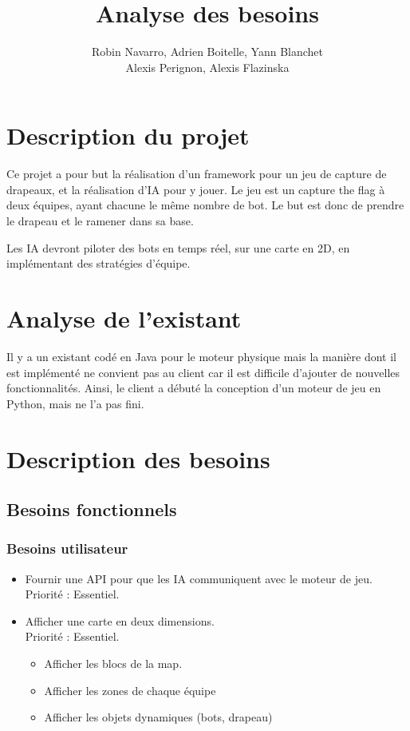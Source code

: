 \documentclass{article}
\title{Analyse des besoins}
\author{Robin Navarro, Adrien Boitelle, Yann Blanchet\\Alexis Perignon, Alexis Flazinska}
\begin{document}
\maketitle
\newpage
\tableofcontents
\newpage
\section{Description du projet}

Ce projet a pour but la réalisation d'un framework pour un jeu de capture de drapeaux, et la réalisation d'IA pour y jouer.
Le jeu est un capture the flag à deux équipes, ayant chacune le même nombre de bot. Le but est donc de prendre le drapeau et le ramener dans sa base.\newline

Les IA devront piloter des bots en temps réel, sur une carte en 2D, en implémentant des stratégies d'équipe.


\section{Analyse de l'existant}
    
Il y a un existant codé en Java pour le moteur physique mais la manière dont il est implémenté ne convient pas au client car il est difficile d'ajouter de nouvelles fonctionnalités. Ainsi, le client a débuté la conception d'un moteur de jeu en Python, mais ne l'a pas fini.

\section{Description des besoins}

\subsection{Besoins fonctionnels}
\subsubsection{Besoins utilisateur}
    \begin{itemize}
        \item Fournir une API pour que les IA communiquent avec le moteur de jeu. \\
                Priorité : Essentiel.\\

        \item Afficher une carte en deux dimensions. \\
            Priorité : Essentiel.
            \begin{itemize}
                \item Afficher les blocs de la map.
                \item Afficher les zones de chaque équipe
                \item Afficher les objets dynamiques (bots, drapeau)
            \end{itemize}

    \end{itemize}
\end{document}

